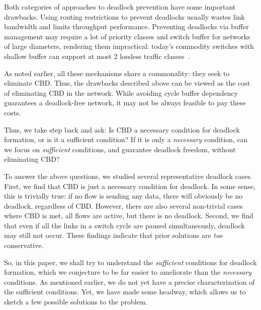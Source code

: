 Both categories of approaches to deadlock prevention have some important
drawbacks.  Using routing restrictions to prevent deadlocks usually wastes link
bandwidth and limits throughput performance. Preventing deadlocks via buffer
management may require a lot of priority classes and switch buffer for networks
of large diameters, rendering them impractical: today's commodity switches with
shallow buffer can support at most 2 lossless traffic classes~\cite{rdmascale}.

As noted earlier, all these mechanisms share a commonality: they seek to
eliminate CBD.  Thus, the drawbacks described above can be
viewed as the cost of eliminating CBD in the network. While
avoiding cycle buffer dependency guarantees a deadlock-free network, it may not
be always feasible to pay these costs.

Thus, we take step back and ask: Is CBD a necessary
condition for deadlock formation, or is it a sufficient condition? If it is only
a {\em necessary} condition, can we focus on {\em sufficient} conditions, and
guarantee deadlock freedom, without  eliminating CBD?

To answer the above questions, we studied several representative deadlock cases.
First, we find that CBD is just a necessary condition for
deadlock. In some sense, this is trivially true: if no flow is sending any data,
there will obviously be no deadlock, regardless of CBD.
However, there are also several non-trivial cases where CBD
is met, all flows are active, but there is no deadlock.  Second, we find that
even if all the links in a switch cycle are paused simultaneously, deadlock may
still not occur.  These findings indicate that prior solutions are {\em too}
conservative.

So, in this paper, we shall try to understand the {\em sufficient} conditions
for deadlock formation, which we conjecture to be far easier to ameliorate than
the {\em necessary} conditions. As mentioned earlier, we do not yet have a
precise characterization of the sufficient conditions. Yet, we have made some
headway, which allows us to sketch a few possible solutions to the problem.
